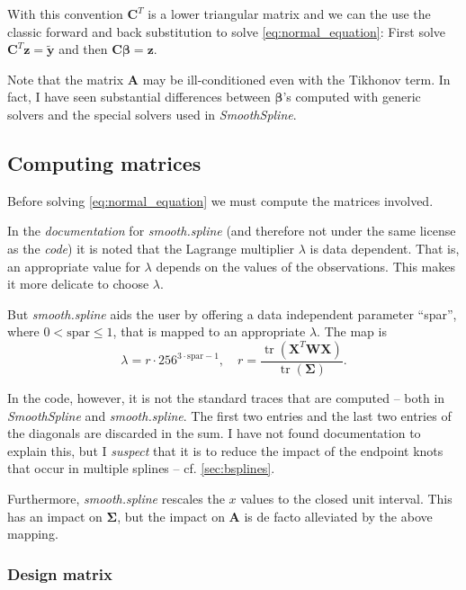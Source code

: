 \documentclass[a4paper]{scrartcl}
\newcommand{\vv}[1]{\ensuremath{\bm{#1}}}
\newcommand{\mat}[1]{\ensuremath{\bm{#1}}}
\newcommand{\T}[1]{\ensuremath{{#1}^{T}}}
\DeclareMathOperator\tr{tr}
\begin{document}
With this convention $\T{\mat C}$ is a lower triangular matrix and we can the use the classic forward and back substitution to solve \cref{eq:normal_equation}:
First solve $\T{\mat C} \vv z = \widetilde{\vv y}$ and then $\mat C \vv \beta = \vv z$.

Note that the matrix $\mat A$ may be ill-conditioned even with the Tikhonov term.
In fact, I have seen substantial differences between $\vv\beta$'s computed with generic solvers and the special solvers used in \textit{SmoothSpline}.


\subsection{Computing matrices}

Before solving \cref{eq:normal_equation} we must compute the matrices involved.

In the \textit{documentation} for \textit{smooth.spline} (and therefore not under the same license as the \textit{code}) it is noted that the Lagrange multiplier $\lambda$ is data dependent.
That is, an appropriate value for $\lambda$ depends on the values of the observations.
This makes it more delicate to choose $\lambda$.

But \textit{smooth.spline} aids the user by offering a data independent parameter \enquote{spar}, where $0 < \text{spar} \leq 1$, that is mapped to an appropriate $\lambda$.
The map is
\begin{equation*}
    \lambda = r\cdot 256^{3\cdot\text{spar} - 1},
    \quad
    r = \frac{\tr(\T{\mat X} \mat W \mat X)}{\tr(\mat\Sigma)}.
\end{equation*}

In the code, however, it is not the standard traces that are computed -- both in \textit{SmoothSpline} and \textit{smooth.spline}.
The first two entries and the last two entries of the diagonals are discarded in the sum.
I have not found documentation to explain this, but I \emph{suspect} that it is to reduce the impact of the endpoint knots that occur in multiple splines -- cf. \cref{sec:bsplines}.

Furthermore, \textit{smooth.spline} rescales the $x$ values to the closed unit interval.
This has an impact on $\mat\Sigma$, but the impact on $\mat A$ is de facto alleviated by the above mapping.


\subsubsection{Design matrix}
\end{document}
